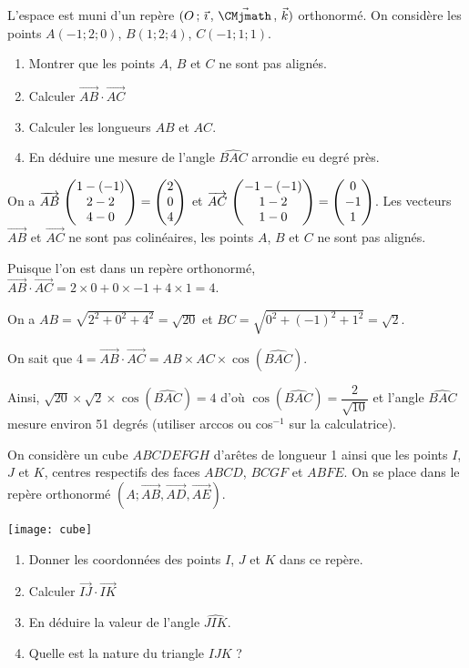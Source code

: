 \documentclass[11pt,fleqn, openany]{book} %
\begin{document}
\begin{exercise}[topic=geom12]L'espace est muni d'un repère $\Oijk$ orthonormé. On considère les points $A(-1;2;0)$, $B(1;2;4)$, $C(-1;1;1)$.
\begin{enumerate}
\item Montrer que les points $A$, $B$ et $C$ ne sont pas alignés.
\item Calculer $\overrightarrow{AB}\cdot \overrightarrow{AC}$
\item Calculer les longueurs $AB$ et $AC$.
\item En déduire une mesure de l'angle $\widehat{BAC}$ arrondie eu degré près.
\end{enumerate}\end{exercise}

\begin{solution}On a $\coorde{AB}{1-(-1)}{2-2}{4-0}=\coordbe{2}{0}{4}$ et $\coorde{AC}{-1-(-1)}{1-2}{1-0}=\coordbe{0}{-1}{1}$. Les vecteurs $\overrightarrow{AB}$ et $\overrightarrow{AC}$ ne sont pas colinéaires, les points $A$, $B$ et $C$ ne sont pas alignés.

Puisque l'on est dans un repère orthonormé, $\overrightarrow{AB}\cdot \overrightarrow{AC}=2 \times 0+0 \times -1 + 4 \times 1 = 4$.

On a $AB = \sqrt{2^2+0^2+4^2}=\sqrt{20}$ et $BC=\sqrt{0^2+(-1)^2+1^2}=\sqrt{2}$.

On sait  que $4=\overrightarrow{AB}\cdot \overrightarrow{AC}=AB \times AC \times \cos (\widehat{BAC})$. 

Ainsi, $\sqrt{20} \times \sqrt{2} \times \cos (\widehat{BAC}) = 4$ d'où $\cos (\widehat{BAC})=\dfrac{2}{\sqrt{10}}$ et l'angle $\widehat{BAC}$ mesure environ 51 degrés (utiliser arccos ou cos$^{-1}$ sur la calculatrice).\end{solution}





\begin{exercise}[topic=geom12]
On considère un cube $ABCDEFGH$ d'arêtes de longueur 1 ainsi que les points $I$, $J$ et $K$, centres respectifs des faces $ABCD$, $BCGF$ et $ABFE$. On se place dans le repère orthonormé $(A;\overrightarrow{AB},\overrightarrow{AD},\overrightarrow{AE})$.

\begin{minipage}{0.4\linewidth}
\begin{center}
\texttt{[image: cube]}
\end{center}\end{minipage}\hfill \begin{minipage}{0.5\linewidth}
\begin{enumerate}
\item Donner les coordonnées des points $I$, $J$ et $K$ dans ce repère.
\item Calculer $\overrightarrow{IJ} \cdot \overrightarrow{IK}$
\item En déduire la valeur de l'angle $\widehat{JIK}$.
\item Quelle est la nature du triangle $IJK$ ?
\end{enumerate}
\end{minipage}

\end{exercise}
\end{document}
